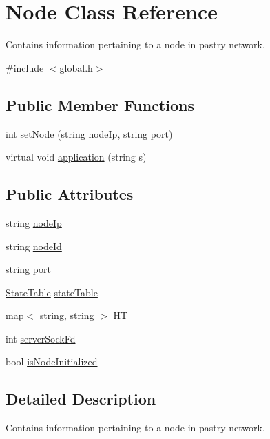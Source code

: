 \hypertarget{classNode}{\section{Node Class Reference}
\label{classNode}
}


Contains information pertaining to a node in pastry network.  




{\ttfamily \#include $<$global.\-h$>$}

\subsection*{Public Member Functions}
\begin{DoxyCompactItemize}
\item 
int \hyperlink{classNode_a805ce0a14cce97c7a2bd7f1bf4bb85b4}{set\-Node} (string \hyperlink{classNode_a59879ea3bcabb0ea5211dffcfbf49b73}{node\-Ip}, string \hyperlink{classNode_adcf35fc0482227d0b62df69b685b94da}{port})
\item 
virtual void \hyperlink{classNode_a252d888f401e1a310cb3d720cf5631a9}{application} (string s)
\end{DoxyCompactItemize}
\subsection*{Public Attributes}
\begin{DoxyCompactItemize}
\item 
string \hyperlink{classNode_a59879ea3bcabb0ea5211dffcfbf49b73}{node\-Ip}
\item 
string \hyperlink{classNode_a709c164657057a32cc79dd7a256ed744}{node\-Id}
\item 
string \hyperlink{classNode_adcf35fc0482227d0b62df69b685b94da}{port}
\item 
\hyperlink{structStateTable}{State\-Table} \hyperlink{classNode_a22dbe41a765f7d31f43f5996d2aedb91}{state\-Table}
\item 
map$<$ string, string $>$ \hyperlink{classNode_aef05ed03e2d587ae1761c7dc4a1ad213}{H\-T}
\item 
int \hyperlink{classNode_a368d0971e95e5481cb17ce82145098bd}{server\-Sock\-Fd}
\item 
bool \hyperlink{classNode_ab125f5f050074e2dae467832069b9414}{is\-Node\-Initialized}
\end{DoxyCompactItemize}


\subsection{Detailed Description}
Contains information pertaining to a node in pastry network. 

